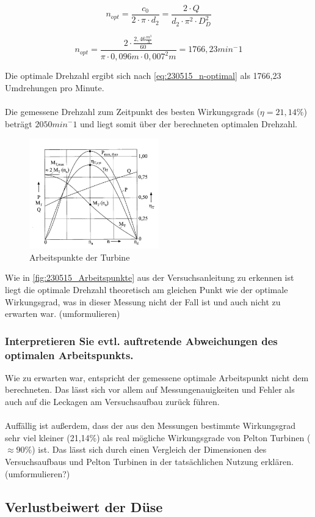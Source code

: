\begin{equation}
 n_{opt}=\frac{c_{0}}{2 \cdot \pi \cdot d_{2}}=\frac{2 \cdot Q}{d_{2} \cdot \pi^2  \cdot D_{D}^2}
\label{eq:230515_n-optimal}
\end{equation}

\begin{equation}
n_{opt}=\frac{ 2 \cdot \frac{2,46 \frac{m^3}{h}}{60}}{\pi \cdot 0,096 m \cdot 0,007^2m}=1766,23  min^-1
\label{eq:230515_n-optimal2}
\end{equation}

 Die optimale Drehzahl ergibt sich nach \autoref{eq:230515_n-optimal} als 1766,23 Umdrehungen pro Minute.
\\\\
Die gemessene Drehzahl zum Zeitpunkt des besten Wirkungsgrads ($\eta=21,14\%$) beträgt $2050 min^-1$ und liegt somit über der berechneten optimalen Drehzahl. 

\begin{figure}[!ht]
		\centering
		\includegraphics[width=0.5\textwidth]{Abbildungen/Arbeitspunkte}
		\caption{Arbeitspunkte der Turbine}
		\label{fig:230515_Arbeitspunkte}
\end{figure}

Wie in \autoref{fig:230515_Arbeitspunkte} aus der Versuchsanleitung zu erkennen ist liegt die optimale Drehzahl theoretisch am gleichen Punkt wie der optimale Wirkungsgrad, was in dieser Messung nicht der Fall ist und auch nicht zu erwarten war.  (umformulieren) 


\subsubsection{Interpretieren Sie evtl. auftretende Abweichungen des optimalen Arbeitspunkts.}

Wie zu erwarten war, entspricht der gemessene optimale Arbeitspunkt nicht dem berechneten. Das lässt sich vor allem auf Messungenauigkeiten und Fehler als auch auf die Leckagen am Versuchsaufbau zurück führen. \\\\ Auffällig ist außerdem, dass der aus den Messungen bestimmte Wirkungsgrad sehr viel kleiner (21,14\%) als real mögliche Wirkungsgrade von Pelton Turbinen ($\approx90\%$) ist. Das lässt sich durch einen Vergleich der Dimensionen des Versuchsaufbaus und Pelton Turbinen in der tatsächlichen Nutzung erklären. (umformulieren?)


\subsection{Verlustbeiwert der Düse}